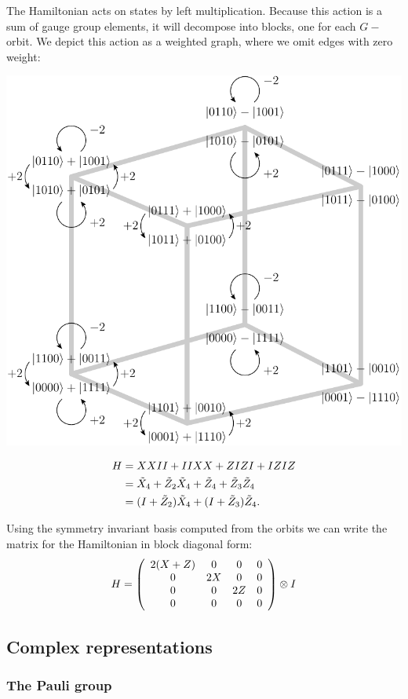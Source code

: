 The Hamiltonian acts on states by left multiplication.
Because this action
is a sum of gauge group elements,
it will decompose into blocks,
one for each $G-$orbit.
We depict this action as a weighted graph, where we omit edges
with zero weight:
\begin{center}
\includegraphics[width=0.7\columnwidth]{pic-orbit.pdf}
\end{center}

\def\Xt{\tilde{X}}
\def\Zt{\tilde{Z}}

\begin{align*}
\Ham &= XXII + IIXX + ZIZI + IZIZ \\
  &= \Xt_4 + \Zt_2\Xt_4 + \Zt_4 + \Zt_3\Zt_4 \\
  &= (I+\Zt_2)\Xt_4 + (I+\Zt_3) \Zt_4.
\end{align*}

Using the symmetry invariant basis computed from the orbits we
can write the matrix for the Hamiltonian in
block diagonal form:
$$
H = 
\left( \begin{array}{cccc}
2(X+Z) & 0 & 0 & 0 \\
0  & 2X & 0 & 0 \\
0  & 0 & 2Z & 0 \\
0  & 0 & 0 & 0 \\
\end{array} \right) \otimes I
$$



\subsection{Complex representations}

\subsubsection{The Pauli group}

